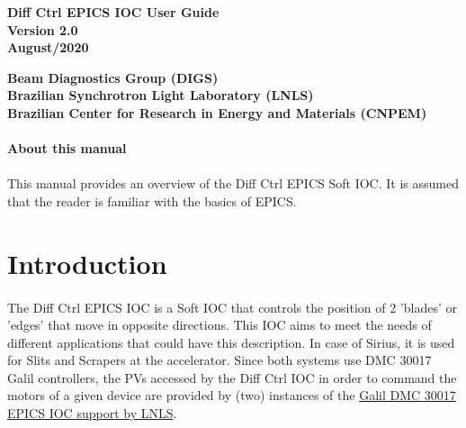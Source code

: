 \documentclass[openany]{article}
\begin{document}
\begin{titlepage}

\thispagestyle{fancy}

\begin{center}

\vspace*{\fill}
\textbf{\Huge Diff Ctrl EPICS IOC User Guide}\\[20pt]
\textbf{\Huge Version 2.0}\\[20pt]
\textbf{\Huge August/2020}
\vspace*{\fill}

\vfill
\textbf{Beam Diagnostics Group (DIGS)}\\[5pt]
\textbf{Brazilian Synchrotron Light Laboratory (LNLS)}\\[5pt]
\textbf{Brazilian Center for Research in Energy and Materials (CNPEM)}
\end{center}

\end{titlepage}

\newpage
\pagestyle{plain} %

\paragraph{}{\Large\bfseries About this manual}

\paragraph{} This manual provides an overview of the Diff Ctrl EPICS Soft IOC. It is assumed that the reader is familiar with the basics of EPICS.

\tableofcontents

\newpage
\section{Introduction}

\paragraph{} The Diff Ctrl EPICS IOC is a Soft IOC that controls the position of 2 'blades' or 'edges' that move in opposite directions. This IOC aims to meet the needs of different applications that could have this description. In case of Sirius, it is used for Slits and Scrapers at the accelerator. Since both systems use DMC 30017 Galil controllers, the PVs accessed by the Diff Ctrl IOC in order to command the motors of a given device are provided by (two) instances of the \href{https://github.com/lnls-dig/galil-dmc30017-epics-ioc}{Galil DMC 30017 EPICS IOC support by LNLS}.
\end{document}
